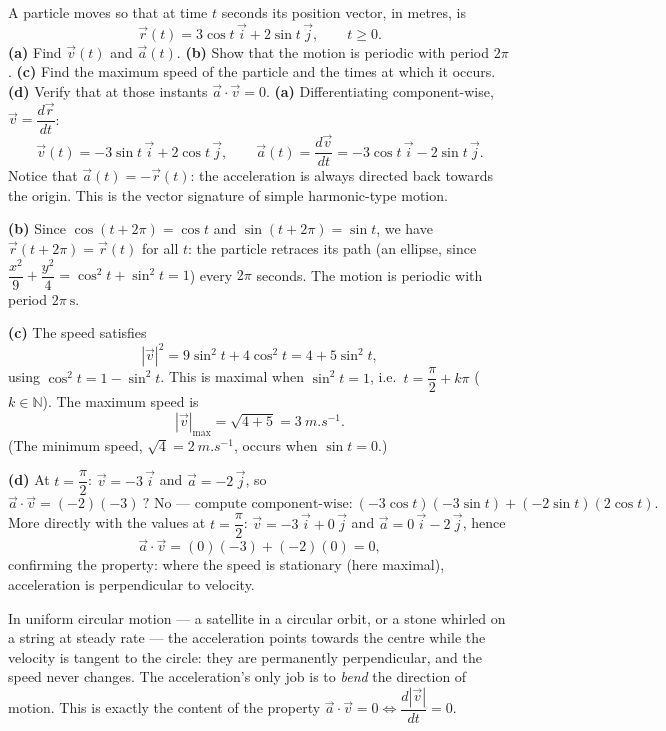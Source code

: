 \documentclass[11pt]{article}
\begin{document}
\begin{exoresolu}
A particle moves so that at time $t$ seconds its position vector, in metres, is
\[
\vec{r}(t) = 3\cos t\,\vec{i} + 2\sin t\,\vec{j}, \qquad t \geq 0.
\]
\textbf{(a)} Find $\vec{v}(t)$ and $\vec{a}(t)$.\quad
\textbf{(b)} Show that the motion is periodic with period $2\pi$.\quad
\textbf{(c)} Find the maximum speed of the particle and the times at which it occurs.\quad
\textbf{(d)} Verify that at those instants $\vec{a}\cdot\vec{v} = 0$.
\tcblower
\textbf{(a)} Differentiating component-wise, $\vec{v} = \dfrac{d\vec{r}}{dt}$:
\[
\vec{v}(t) = -3\sin t\,\vec{i} + 2\cos t\,\vec{j},
\qquad
\vec{a}(t) = \frac{d\vec{v}}{dt} = -3\cos t\,\vec{i} - 2\sin t\,\vec{j}.
\]
Notice that $\vec{a}(t) = -\vec{r}(t)$: the acceleration is always directed back towards the origin. This is the vector signature of simple harmonic-type motion.

\textbf{(b)} Since $\cos(t + 2\pi) = \cos t$ and $\sin(t + 2\pi) = \sin t$, we have $\vec{r}(t + 2\pi) = \vec{r}(t)$ for all $t$: the particle retraces its path (an ellipse, since $\dfrac{x^2}{9} + \dfrac{y^2}{4} = \cos^2 t + \sin^2 t = 1$) every $2\pi$ seconds. The motion is periodic with period $2\pi\ \mathrm{s}$.

\textbf{(c)} The speed satisfies
\[
|\vec{v}|^2 = 9\sin^2 t + 4\cos^2 t = 4 + 5\sin^2 t,
\]
using $\cos^2 t = 1 - \sin^2 t$. This is maximal when $\sin^2 t = 1$, i.e.\ $t = \dfrac{\pi}{2} + k\pi$ ($k \in \mathbb{N}$). The maximum speed is
\[
|\vec{v}|_{\max} = \sqrt{4 + 5} = \SI{3}{m.s^{-1}}.
\]
(The minimum speed, $\sqrt{4} = \SI{2}{m.s^{-1}}$, occurs when $\sin t = 0$.)

\textbf{(d)} At $t = \dfrac{\pi}{2}$: $\vec{v} = -3\,\vec{i}$ and $\vec{a} = -2\,\vec{j}$, so
\[
\vec{a}\cdot\vec{v} = (-2)(-3)\ \text{? No — compute component-wise:}\ (-3\cos t)(-3\sin t) + (-2\sin t)(2\cos t).
\]
More directly with the values at $t = \dfrac{\pi}{2}$: $\vec{v} = -3\,\vec{i} + 0\,\vec{j}$ and $\vec{a} = 0\,\vec{i} - 2\,\vec{j}$, hence
\[
\vec{a}\cdot\vec{v} = (0)(-3) + (-2)(0) = 0,
\]
confirming the property: where the speed is stationary (here maximal), acceleration is perpendicular to velocity.
\end{exoresolu}

\begin{savaistu}
In uniform circular motion — a satellite in a circular orbit, or a stone whirled on a string at steady rate — the acceleration points towards the centre while the velocity is tangent to the circle: they are permanently perpendicular, and the speed never changes. The acceleration's only job is to \emph{bend} the direction of motion. This is exactly the content of the property $\vec{a}\cdot\vec{v} = 0 \Leftrightarrow \dfrac{d|\vec{v}|}{dt} = 0$.
\end{savaistu}
\end{document}
